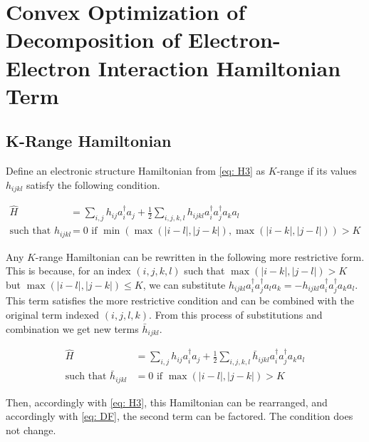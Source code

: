 

\chapter{Convex Optimization of Decomposition of Electron-Electron Interaction Hamiltonian Term}

\section{K-Range Hamiltonian}

Define an electronic structure Hamiltonian from \eqref{eq: H3} as $K$-range if its values $h_{ijkl}$ satisfy the following condition.

\begin{equation}
    \begin{split}
        \hat{H} &= \sum_{i, j} h_{ij}a^\dag_ia_j + \frac{1}{2}\sum_{i,j,k,l} h_{ijkl}a^\dag_ia^\dag_ja_ka_l  \\
        \text{such that } h_{ijkl} &= 0 \text{ if } \min(\max(|i - l|, |j - k|), \max(|i - k|, |j - l|)) > K
    \end{split}
\end{equation}

Any $K$-range Hamiltonian can be rewritten in the following more restrictive form. This is because, for an index $(i, j, k, l)$ such that $\max(|i - k|, |j - l|) > K$ but $\max(|i - l|, |j - k|) \leq K$, we can substitute $h_{ijkl}a^\dag_ia^\dag_ja_la_k = -h_{ijkl}a^\dag_ia^\dag_ja_ka_l$. This term satisfies the more restrictive condition and can be combined with the original term indexed $(i, j, l, k)$. From this process of substitutions and combination we get new terms $\bar{h}_{ijkl}$.

\begin{equation}
    \begin{split}
        \hat{H} &= \sum_{i, j} h_{ij}a^\dag_ia_j + \frac{1}{2}\sum_{i,j,k,l} \bar{h}_{ijkl}a^\dag_ia^\dag_ja_ka_l \\
        \text{such that } \bar{h}_{ijkl} &= 0 \text{ if } \max(|i - l|, |j - k|) > K
    \end{split}
\end{equation}

Then, accordingly with \eqref{eq: H3}, this Hamiltonian can be rearranged, and accordingly with \eqref{eq: DF}, the second term can be factored. The condition does not change.

